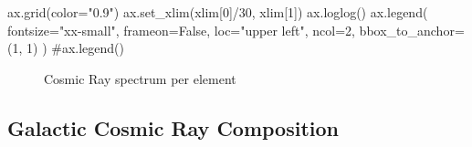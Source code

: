 \documentclass[
  letterpaper,
  DIV=11,
  numbers=noendperiod]{scrreprt}
\newenvironment{Shaded}{\begin{snugshade}}{\end{snugshade}}
\newcommand{\CommentTok}[1]{\textcolor[rgb]{0.37,0.37,0.37}{#1}}
\newcommand{\DecValTok}[1]{\textcolor[rgb]{0.68,0.00,0.00}{#1}}
\newcommand{\NormalTok}[1]{\textcolor[rgb]{0.00,0.23,0.31}{#1}}
\newcommand{\OperatorTok}[1]{\textcolor[rgb]{0.37,0.37,0.37}{#1}}
\newcommand{\StringTok}[1]{\textcolor[rgb]{0.13,0.47,0.30}{#1}}
\newcommand{\VariableTok}[1]{\textcolor[rgb]{0.07,0.07,0.07}{#1}}
\begin{document}
\begin{Shaded}
\begin{Highlighting}[]
\NormalTok{ax.grid(color}\OperatorTok{=}\StringTok{"0.9"}\NormalTok{)}
\NormalTok{ax.set\_xlim(xlim[}\DecValTok{0}\NormalTok{]}\OperatorTok{/}\DecValTok{30}\NormalTok{, xlim[}\DecValTok{1}\NormalTok{])}
\NormalTok{ax.loglog()}
\NormalTok{ax.legend(}
\NormalTok{    fontsize}\OperatorTok{=}\StringTok{"xx{-}small"}\NormalTok{, frameon}\OperatorTok{=}\VariableTok{False}\NormalTok{, loc}\OperatorTok{=}\StringTok{"upper left"}\NormalTok{, ncol}\OperatorTok{=}\DecValTok{2}\NormalTok{, bbox\_to\_anchor}\OperatorTok{=}\NormalTok{(}\DecValTok{1}\NormalTok{, }\DecValTok{1}\NormalTok{)}
\NormalTok{)}
\CommentTok{\#ax.legend()}
\end{Highlighting}
\end{Shaded}

\begin{figure}[H]


\caption{\label{fig-primaries}Cosmic Ray spectrum per element}

\end{figure}%

\subsection{Galactic Cosmic Ray
Composition}\label{galactic-cosmic-ray-composition}
\end{document}
